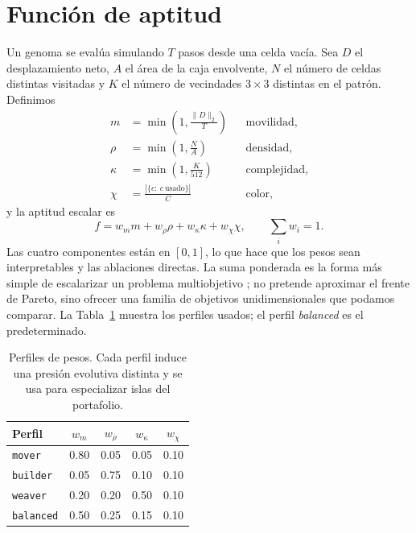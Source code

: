 \documentclass[11pt,a4paper]{article}
\begin{document}
\section{Funci\'on de aptitud}\label{sec:fitness}

Un genoma se eval\'ua simulando $T$ pasos desde una celda vac\'ia.  Sea $D$ el
desplazamiento neto, $A$ el \'area de la caja envolvente, $N$ el n\'umero de
celdas distintas visitadas y $K$ el n\'umero de vecindades $3\times3$ distintas
en el patr\'on.  Definimos
\begin{align}
  m &= \min\!\left(1,\frac{\lVert D\rVert_2}{T}\right) && \text{movilidad,}\\
  \rho &= \min\!\left(1,\frac{N}{A}\right) && \text{densidad,}\\
  \kappa &= \min\!\left(1,\frac{K}{512}\right) && \text{complejidad,}\\
  \chi &= \frac{|\{c:\ c\ \text{usado}\}|}{C} && \text{color,}
\end{align}
y la aptitud escalar es
\begin{equation}
  f = w_m m + w_\rho \rho + w_\kappa \kappa + w_\chi \chi,
  \qquad \textstyle\sum_i w_i = 1 .
\end{equation}
Las cuatro componentes est\'an en $[0,1]$, lo que hace que los pesos sean
interpretables y las ablaciones directas.  La suma ponderada es la forma m\'as
simple de escalarizar un problema multiobjetivo \citep{deb2001}; no pretende
aproximar el frente de Pareto, sino ofrecer una familia de objetivos
unidimensionales que podamos comparar.  La Tabla~\ref{tab:profiles} muestra
los perfiles usados; el perfil \emph{balanced} es el predeterminado.

\begin{table}[t]
\centering
\caption{Perfiles de pesos.  Cada perfil induce una presi\'on evolutiva
distinta y se usa para especializar islas del portafolio.}
\label{tab:profiles}
\begin{tabular}{lcccc}
\toprule
Perfil & $w_m$ & $w_\rho$ & $w_\kappa$ & $w_\chi$ \\
\midrule
\texttt{mover}    & 0.80 & 0.05 & 0.05 & 0.10 \\
\texttt{builder}  & 0.05 & 0.75 & 0.10 & 0.10 \\
\texttt{weaver}   & 0.20 & 0.20 & 0.50 & 0.10 \\
\texttt{balanced} & 0.50 & 0.25 & 0.15 & 0.10 \\
\bottomrule
\end{tabular}
\end{table}
\end{document}
